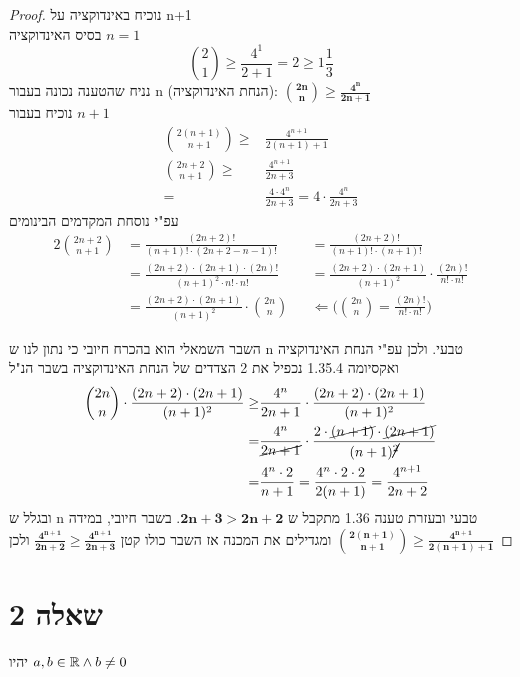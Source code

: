 \documentclass{article}
\begin{document}
	 \begin{proof}
		\nl
		נוכיח באינדוקציה על n+1 \\
		בסיס האינדוקציה
		$n = 1$
		\[
			{2 \choose 1} \geq \frac{4^1}{2+1} = 2 \geq 1 \frac{1}{3}
		\]
נניח שהטענה נכונה בעבור n (הנחת האינדוקציה):
		$\bm{{2n \choose n} \geq \frac{4^n}{2n+1}}$ \\
נוכיח בעבור $n + 1$
		\begin{align*}
			{2(n+1) \choose n+1} \geq &\frac{4^{n+1}}{2(n+1)+1} \\[1em]
			{2n + 2 \choose n + 1} \geq &\frac{4^{n+1}}{2n + 3} \\[1em]
			=&\frac{4 \cdot 4^n}{2n+3}
			=4 \cdot \frac{4^n}{2n+3}
		\end{align*}
עפ"י נוסחת המקדמים הבינומים
		\begin{alignat*}{2}
			{2n + 2 \choose n + 1} &=
			\frac{(2n+2)!}{(n+1)! \cdot (2n+2-n-1)!}
			&&=\frac{(2n+2)!}{(n+1)! \cdot (n+1)!} \\[1em]
			&=\frac{(2n+2) \cdot (2n+1) \cdot (2n)!}{(n+1)^2 \cdot n! \cdot n!}
			&&=\frac{(2n+2) \cdot (2n+1)}{(n+1)^2} \cdot \frac{(2n)!}{n! \cdot n!} \\[1em]
			&=\frac{(2n+2) \cdot (2n+1)}{(n+1)^2} \cdot {2n \choose n}
			&& \Leftarrow \bigg( {2n \choose n} = \frac{(2n)!}{n! \cdot n!} \bigg)
		\end{alignat*}

		השבר השמאלי הוא בהכרח חיובי כי נתון לנו ש n טבעי.
ולכן עפ"י הנחת האינדוקציה ואקסיומה 1.35.4 נכפיל את 2 הצדדים של הנחת האינדוקציה בשבר הנ"ל
		\begin{align*}
			{2n \choose n} \cdot \frac{(2n+2) \cdot (2n+1)}{(n+1)^2} \geq
			&\frac{4^n}{2n+1} \cdot \frac{(2n+2) \cdot (2n+1)}{(n+1)^2} \\
			=&\frac{4^n}{\cancel{2n+1}} \cdot \frac{2 \cdot \cancel{(n+1)} \cdot \cancel{(2n+1)}}{(n+1)\cancel{^2}} \\
			=&\frac{4^n \cdot 2}{n+1}
			=\frac{4^n \cdot 2 \cdot 2}{2(n+1)} =
			\frac{4^{n+1}}{2n+2}
		\end{align*}
		ובגלל ש n טבעי ובעזרת טענה 1.36 מתקבל ש
		$\bm{2n + 3 > 2n + 2}$.
		בשבר חיובי,
		במידה ומגדילים את המכנה אז השבר כולו קטן
		$\bm{\frac{4^{n+1}}{2n+2} \geq \frac{4^{n+1}}{2n+3}}$
		ולכן
		$\bm{{2(n+1) \choose n+1} \geq \frac{4^{n+1}}{2(n+1)+1}}$
	\end{proof}

	\pagebreak
	\section*{שאלה 2}
	יהיו
	$\displaystyle{a,b \in \mathbb{R}\land b \neq 0}$
\end{document}
